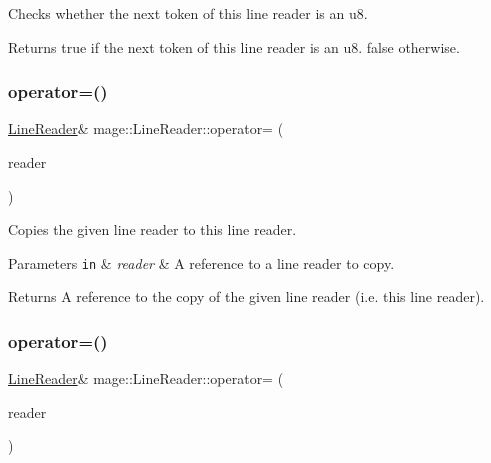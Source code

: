 Checks whether the next token of this line reader is an {\ttfamily u8}.

\begin{DoxyReturn}{Returns}
{\ttfamily true} if the next token of this line reader is an {\ttfamily u8}. {\ttfamily false} otherwise. 
\end{DoxyReturn}
\hypertarget{classmage_1_1_line_reader_a2247078d0b5602f9a9a6b74019832faf}{}\label{classmage_1_1_line_reader_a2247078d0b5602f9a9a6b74019832faf} 
\subsubsection{\texorpdfstring{operator=()}{operator=()}\hspace{0.1cm}{\footnotesize\ttfamily [1/2]}}
{\footnotesize\ttfamily \hyperlink{classmage_1_1_line_reader}{Line\+Reader}\& mage\+::\+Line\+Reader\+::operator= (\begin{DoxyParamCaption}\item[{const \hyperlink{classmage_1_1_line_reader}{Line\+Reader} \&}]{reader }\end{DoxyParamCaption})\hspace{0.3cm}{\ttfamily [delete]}}

Copies the given line reader to this line reader.


\begin{DoxyParams}[1]{Parameters}
\mbox{\tt in}  & {\em reader} & A reference to a line reader to copy. \\
\hline
\end{DoxyParams}
\begin{DoxyReturn}{Returns}
A reference to the copy of the given line reader (i.\+e. this line reader). 
\end{DoxyReturn}
\hypertarget{classmage_1_1_line_reader_a45504c0ba4238eedf851cfb9df081a01}{}\label{classmage_1_1_line_reader_a45504c0ba4238eedf851cfb9df081a01} 
\subsubsection{\texorpdfstring{operator=()}{operator=()}\hspace{0.1cm}{\footnotesize\ttfamily [2/2]}}
{\footnotesize\ttfamily \hyperlink{classmage_1_1_line_reader}{Line\+Reader}\& mage\+::\+Line\+Reader\+::operator= (\begin{DoxyParamCaption}\item[{\hyperlink{classmage_1_1_line_reader}{Line\+Reader} \&\&}]{reader }\end{DoxyParamCaption})\hspace{0.3cm}{\ttfamily [delete]}}

